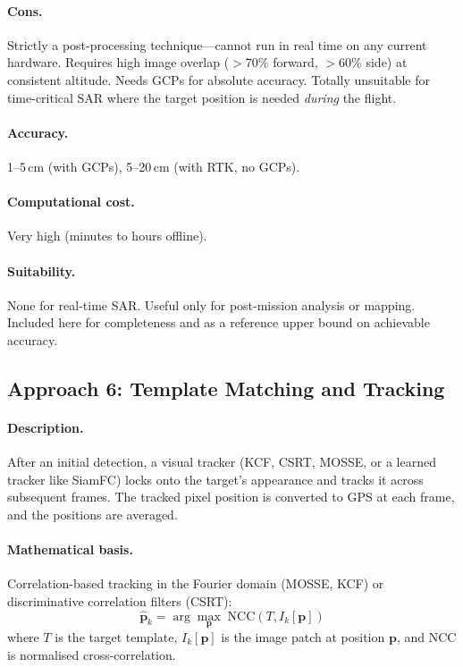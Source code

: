\paragraph{Cons.}
Strictly a post-processing technique---cannot run in real time on any current hardware.  Requires high image overlap ($>$70\% forward, $>$60\% side) at consistent altitude.  Needs GCPs for absolute accuracy.  Totally unsuitable for time-critical SAR where the target position is needed \emph{during} the flight.

\paragraph{Accuracy.}  1--5\,cm (with GCPs), 5--20\,cm (with RTK, no GCPs).

\paragraph{Computational cost.}  Very high (minutes to hours offline).

\paragraph{Suitability.}  None for real-time SAR.  Useful only for post-mission analysis or mapping.  Included here for completeness and as a reference upper bound on achievable accuracy.

\subsection{Approach 6: Template Matching and Tracking}\label{sec:approach-template}

\paragraph{Description.}
After an initial detection, a visual tracker (KCF, CSRT, MOSSE, or a learned tracker like SiamFC) locks onto the target's appearance and tracks it across subsequent frames.  The tracked pixel position is converted to GPS at each frame, and the positions are averaged.

\paragraph{Mathematical basis.}
Correlation-based tracking in the Fourier domain (MOSSE, KCF) or discriminative correlation filters (CSRT):
\begin{equation}
  \hat{\mathbf{p}}_k = \arg\max_{\mathbf{p}} \; \mathrm{NCC}(T, I_k[\mathbf{p}])
\end{equation}
where $T$ is the target template, $I_k[\mathbf{p}]$ is the image patch at position $\mathbf{p}$, and NCC is normalised cross-correlation.

